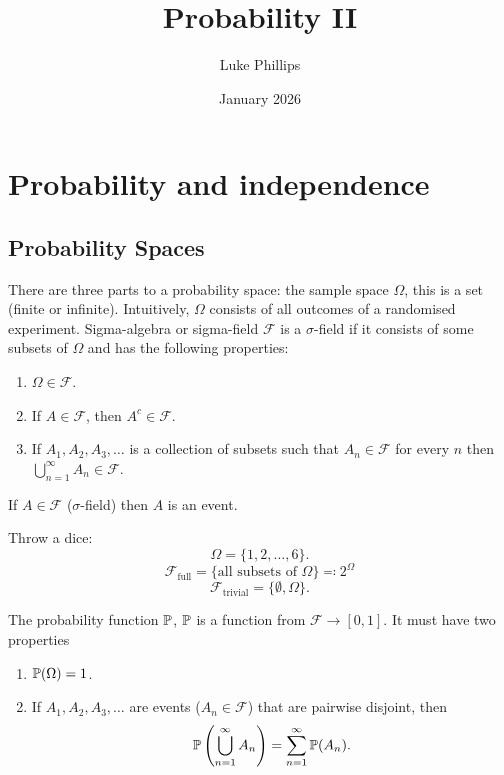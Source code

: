 \documentclass[10pt, a4paper]{article}
\title{Probability II}
\author{Luke Phillips}
\date{January 2026}
\begin{document}
\maketitle

\newpage

\tableofcontents

\newpage

\section{Probability and independence}

\subsection{Probability Spaces}
There are three parts to a probability space:
the sample space $\Omega$,
this is a set
(finite or infinite).
Intuitively,
$\Omega$ consists of all outcomes of a randomised experiment.
Sigma-algebra or sigma-field $\mathcal{F}$ is a $\sigma$-field if it consists of some subsets of $\Omega$ and has the following properties:
\begin{enumerate}[label = (\alph*)]
    \item $\Omega \in \mathcal{F}$.

    \item If $A \in \mathcal{F}$,
    then $A ^ c \in \mathcal{F}$.

    \item If $A_1, A_2, A_3, \dotsc$ is a collection of subsets such that $A_n \in \mathcal{F}$ for every $n$ then $\bigcup_{n = 1}^{\infty}A_n \in \mathcal{F}$.
\end{enumerate}

\begin{definition}
    If $A \in \mathcal{F}$
    ($\sigma$-field)
    then $A$ is an event.
\end{definition}

\begin{example}
    Throw a dice:
    \[
    \Omega = \{1, 2, \dotsc, 6\}.
    \]
    \[
    \mathcal{F}_{\text{full}} = \{\text{all subsets of $\Omega$}\} \eqqcolon 2 ^ {\Omega}
    \]
    \[
    \mathcal{F}_{\text{trivial}} = \{\emptyset, \Omega\}.
    \]
\end{example}

The probability function $\P$,
$\P$ is a function from $\mathcal{F} \to [0, 1]$.
It must have two properties
\begin{enumerate}[label = (\alph*)]
    \item $\P(\Omega) = 1$.

    \item If $A_1, A_2, A_3, \dotsc$ are events
    ($A_n \in \mathcal{F}$)
    that are pairwise disjoint,
    then
    \[
    \P\left(\bigcup_{n = 1}^{\infty}A_n\right) = \sum_{n = 1}^{\infty}\P(A_n).
    \]
\end{enumerate}
\end{document}
